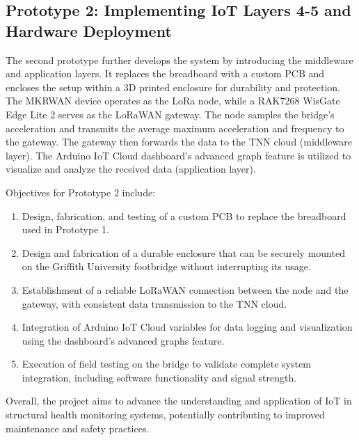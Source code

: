\clearpage

\subsection{Prototype 2: Implementing IoT Layers 4-5 and Hardware Deployment}

The second prototype further develops the system by introducing the middleware and application layers. It replaces the breadboard with a custom PCB and encloses the setup within a 3D printed enclosure for durability and protection. The MKRWAN device operates as the LoRa node, while a RAK7268 WisGate Edge Lite 2 serves as the LoRaWAN gateway. The node samples the bridge's acceleration and transmits the average maximum acceleration and frequency to the gateway. The gateway then forwards the data to the TNN cloud (middleware layer). The Arduino IoT Cloud dashboard's advanced graph feature is utilized to visualize and analyze the received data (application layer).

Objectives for Prototype 2 include:

\begin{enumerate}
\item Design, fabrication, and testing of a custom PCB to replace the breadboard used in Prototype 1.
\item Design and fabrication of a durable enclosure that can be securely mounted on the Griffith University footbridge without interrupting its usage.
\item Establishment of a reliable LoRaWAN connection between the node and the gateway, with consistent data transmission to the TNN cloud.
\item Integration of Arduino IoT Cloud variables for data logging and visualization using the dashboard's advanced graphs feature.
\item Execution of field testing on the bridge to validate complete system integration, including software functionality and signal strength.
\end{enumerate}

Overall, the project aims to advance the understanding and application of IoT in structural health monitoring systems, potentially contributing to improved maintenance and safety practices.


